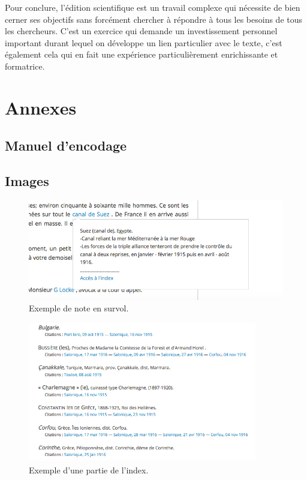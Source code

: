 \documentclass[12pt,a4paper]{book} %
\begin{document}
Pour conclure, l'édition scientifique est un travail complexe qui nécessite de bien cerner ses objectifs sans forcément chercher à répondre à tous les besoins de tous les chercheurs. C'est un exercice qui demande un investissement personnel important durant lequel on développe un lien particulier avec le texte, c'est également cela qui en fait une expérience particulièrement enrichissante et formatrice. 


\appendix
\part*{Annexes}
\chapter{Manuel d'encodage}

\chapter{Images}
\bigskip


\begin{figure}[!h]
\centering
\begin{center}
\includegraphics[width=13cm]{1.JPG}
\end{center}
\caption{Exemple de note en survol.}
\end{figure}


\begin{figure}[!h]
\centering
\begin{center}
\includegraphics[width=10cm]{2.JPG}
\end{center}
\caption{Exemple d'une partie de l'index.}
\end{figure}
\end{document}
